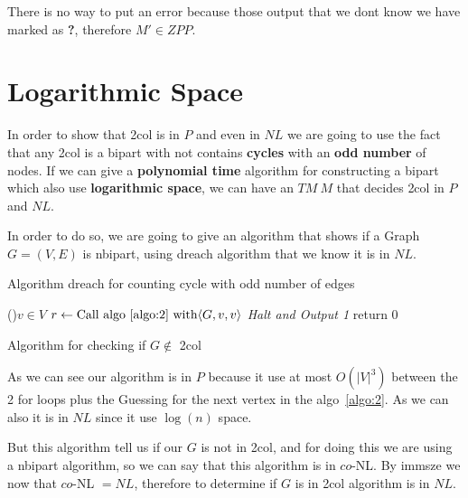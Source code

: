 \documentclass[12pt, a4paper]{article}
\begin{document}
There is no way to put an error because those output that we dont know we have marked as \textbf{?}, therefore $M' \in ZPP$.


\section{Logarithmic Space}
In order to show that \acrfull{2col} is in $P$ and even in $NL$ we are going to use the fact that any \acrshort{2col} is a \acrfull{bipart} with not contains \textbf{cycles} with an \textbf{odd number} of nodes. If we can give a \textbf{polynomial time} algorithm for constructing a \acrshort{bipart} which also use \textbf{logarithmic space}, we can have an $TM\ M$ that decides \acrshort{2col} in $P$ and $NL$.

In order to do so, we are going to give an algorithm that shows if a Graph $G=(V,E)$ is \acrfull{nbipart}, using \acrfull{dreach} algorithm that we know it is in $NL$.

\begin{algorithm}[H]
  \caption{Algorithm \acrshort{dreach} for counting cycle with odd number of edges}\label{algo:2}
\end{algorithm}



\begin{algorithm}[H]
  \Begin
  {\For(){$v \in V$}
  {$r \leftarrow \text{Call algo~\ref{algo:2} with} \langle G,v,v \rangle$\;
   {\emph{Halt and Output 1}}
  }
  return 0
  }
  \caption{Algorithm for checking if $G \notin$ \acrshort{2col}}\label{algo:3}
\end{algorithm}

As we can see our algorithm is in $P$ because it use at most $O(|V|^3)$ between the 2 for loops plus the Guessing for the next vertex in the algo~\ref{algo:2}. As we can also it is in $NL$ since it use $\log(n)$ space.

But this algorithm tell us if our $G$ is not in \acrshort{2col}, and for doing this we are using a \acrshort{nbipart} algorithm, so we can say that this algorithm is in $co$-NL\@. By \acrfull{immsze} we now that $co$-NL $= NL$, therefore to determine if $G$ is in \acrshort{2col} algorithm is in $NL$.
\end{document}
